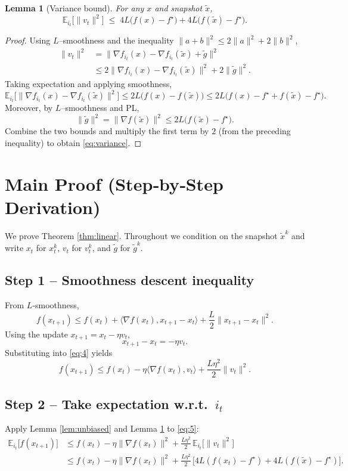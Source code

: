 \documentclass[11pt]{article}
\newtheorem{lemma}{Lemma}[section]
\begin{document}
\begin{lemma}[Variance bound]\label{lem:variance}
For any $x$ and snapshot $\tilde{x}$,
\[
\mathbb{E}_{i_t}\!\bigl[\|v_t\|^{2}\bigr]
\;\le\;
4L\bigl(f(x)-f^{\star}\bigr)
+4L\bigl(f(\tilde{x})-f^{\star}\bigr).
\tag{3}
\]
\end{lemma}
\begin{proof}
Using $L$–smoothness and the inequality 
$\|a+b\|^{2}\le 2\|a\|^{2}+2\|b\|^{2}$,
\[
\begin{aligned}
\|v_t\|^{2}
&=\bigl\|\nabla f_{i_t}(x)-\nabla f_{i_t}(\tilde{x})+ \tilde{g}\bigr\|^{2}\\
&\le 2\bigl\|\nabla f_{i_t}(x)-\nabla f_{i_t}(\tilde{x})\bigr\|^{2}
   +2\|\tilde{g}\|^{2}.
\end{aligned}
\]
Taking expectation and applying smoothness,
\[
\mathbb{E}_{i_t}\!\bigl[\|\nabla f_{i_t}(x)-\nabla f_{i_t}(\tilde{x})\|^{2}\bigr]
\le 2L\bigl( f(x)-f(\tilde{x})\bigr)
\le 2L\bigl( f(x)-f^{\star}+f(\tilde{x})-f^{\star}\bigr).
\]
Moreover, by $L$–smoothness and PL,
\[
\|\tilde{g}\|^{2}= \|\nabla f(\tilde{x})\|^{2}
\le 2L\bigl(f(\tilde{x})-f^{\star}\bigr).
\]
Combine the two bounds and multiply the first term by $2$ (from the
preceding inequality) to obtain \eqref{eq:variance}.
\end{proof}

\section*{Main Proof (Step‑by‑Step Derivation)}
We prove Theorem \ref{thm:linear}.  Throughout we condition on the snapshot
$\tilde{x}^{k}$ and write $x_t$ for $x_t^{k}$, $v_t$ for $v_t^{k}$, and
$\tilde{g}$ for $\tilde{g}^{k}$.

\subsection*{Step 1 – Smoothness descent inequality}
From $L$‑smoothness,
\[
f(x_{t+1})\le
f(x_t)+\langle\nabla f(x_t),x_{t+1}-x_t\rangle
+\frac{L}{2}\|x_{t+1}-x_t\|^{2}.
\tag{4}
\]
Using the update $x_{t+1}=x_t-\eta v_t$,
\[
x_{t+1}-x_t=-\eta v_t.
\]
Substituting into \eqref{eq:4} yields
\[
f(x_{t+1})\le f(x_t)-\eta\langle\nabla f(x_t),v_t\rangle
+\frac{L\eta^{2}}{2}\|v_t\|^{2}.
\tag{5}
\]

\subsection*{Step 2 – Take expectation w.r.t.\ $i_t$}
Apply Lemma \ref{lem:unbiased} and Lemma \ref{lem:variance} to \eqref{eq:5}:
\[
\begin{aligned}
\mathbb{E}_{i_t}\!\bigl[f(x_{t+1})\bigr]
&\le f(x_t)-\eta\|\nabla f(x_t)\|^{2}
   +\frac{L\eta^{2}}{2}\,
      \mathbb{E}_{i_t}\!\bigl[\|v_t\|^{2}\bigr] \\[4pt]
&\le f(x_t)-\eta\|\nabla f(x_t)\|^{2}
   +\frac{L\eta^{2}}{2}\,
      \bigl[4L(f(x_t)-f^{\star})+4L(f(\tilde{x})-f^{\star})\bigr].
\end{aligned}
\tag{6}
\]
\end{document}
